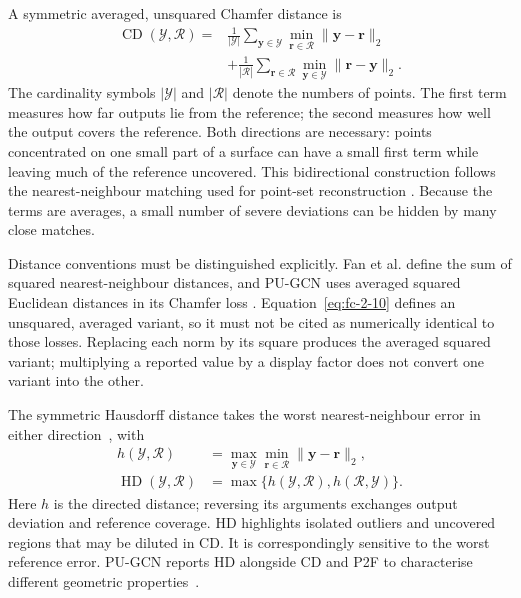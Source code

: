 A symmetric averaged, unsquared Chamfer distance is
\begin{equation}
 \begin{aligned}
 \operatorname{CD}(\mathcal Y,\mathcal R)
 ={}&\frac1{|\mathcal Y|}\sum_{\mathbf y\in\mathcal Y}
 \min_{\mathbf r\in\mathcal R}\|\mathbf y-\mathbf r\|_2\\
 &+\frac1{|\mathcal R|}\sum_{\mathbf r\in\mathcal R}
 \min_{\mathbf y\in\mathcal Y}\|\mathbf r-\mathbf y\|_2.
 \end{aligned}
 \label{eq:fc-2-10}
\end{equation}
The cardinality symbols $|\mathcal Y|$ and $|\mathcal R|$ denote the
numbers of points. The first term measures how far outputs lie from the
reference; the second measures how well the output covers the reference.
Both directions are necessary: points concentrated on one small part of
a surface can have a small first term while leaving much of the reference
uncovered. This bidirectional construction follows the nearest-neighbour
matching used for point-set reconstruction
\cite{fan2017pointsetgen,qian2021pugcn}. Because the terms are averages,
a small number of severe deviations can be hidden by many close matches.

Distance conventions must be distinguished explicitly. Fan et al. define
the sum of squared nearest-neighbour distances, and PU-GCN uses averaged
squared Euclidean distances in its Chamfer loss
\cite{qian2021pugcn,fan2017pointsetgen}. Equation~\eqref{eq:fc-2-10} defines
an unsquared, averaged variant, so it must not be cited as numerically
identical to those losses. Replacing each norm by its square produces the
averaged squared variant; multiplying a reported value by a display factor
does not convert one variant into the other.

The symmetric Hausdorff distance takes the worst nearest-neighbour error
in either direction~\cite{huttenlocher1993hausdorff}, with
\begin{equation}
 \begin{aligned}
 h(\mathcal Y,\mathcal R)&=
 \max_{\mathbf y\in\mathcal Y}\min_{\mathbf r\in\mathcal R}
 \|\mathbf y-\mathbf r\|_2,\\
 \operatorname{HD}(\mathcal Y,\mathcal R)&=
 \max\{h(\mathcal Y,\mathcal R),h(\mathcal R,\mathcal Y)\}.
 \end{aligned}
 \label{eq:fc-2-11}
\end{equation}
Here $h$ is the directed distance; reversing its arguments exchanges output
deviation and reference coverage. HD highlights isolated outliers and
uncovered regions that may be diluted in CD. It is correspondingly sensitive
to the worst reference error. PU-GCN reports HD alongside CD and P2F to
characterise different geometric properties~\cite{qian2021pugcn}.


